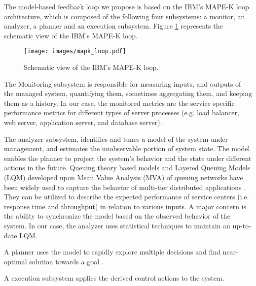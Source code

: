 \documentclass[11pt]{article}
\begin{document}
 The model-based feedback loop we propose is based on the IBM's MAPE-K loop architecture, which is composed of the following four subsystems: a monitor, an analyzer, a planner and an execution subsystem.
Figure \ref{fig:mapk_loop} represents the schematic view of the IBM's MAPE-K loop.
	\begin{figure}
		\centering
			\texttt{[image: images/mapk\_loop.pdf]}
		\caption{Schematic view of the IBM's MAPE-K loop.}
		\label{fig:mapk_loop}
	\end{figure}
	
 The Monitoring subsystem is responsible for measuring inputs, and outputs of the managed system, quantifying them, sometimes aggregating them, and keeping them as a history.
In our case, the monitored metrics are the service specific performance metrics for different types of server processes (e.g. load balancer, web server, application server, and database server).

   The analyzer subsystem, identifies and tunes a model of the system under management, and estimates the unobservable portion of system state. The model enables the planner to project the system's behavior and the state under different actions in the future.   
   Queuing theory based models \cite{petriu_approximate_1994,petriu_approximate_2004,badidi-queuing-2005} and Layered Queuing Models (LQM) \cite{rolia_method_1995,ramesh_multi-layer_1998} developed upon Mean Value Analysis (MVA) of queuing networks have been widely used to capture the behavior of multi-tier distributed applications \cite{litoiu_hierarchical_2005, xu_performance_2006,hamoun_ghanbari_tuning,liu_layered_????}. 
They can be utilized to describe the expected performance of service centers (i.e. response time and throughput) in relation to various inputs.  A major concern is the ability to synchronize the model based on the observed behavior of the system. In our case, the analyzer uses statistical techniques to maintain an up-to-date LQM.
 
   A planner uses the model to rapidly explore multiple decisions and find near-optimal solution towards a goal \cite{litoiu_hierarchical_2005,aiber2004autonomic}. 

   A execution subsystem applies the derived control actions to the system.
  
\end{document}
